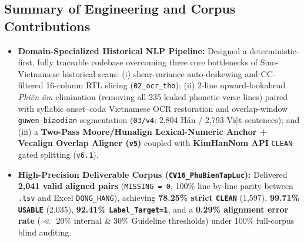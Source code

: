 \documentclass[a4paper]{article}
\begin{document}
\subsection{Summary of Engineering and Corpus Contributions}
\begin{itemize}
  \item \textbf{Domain-Specialized Historical NLP Pipeline:} Designed a deterministic-first, fully traceable codebase overcoming three core bottlenecks of Sino-Vietnamese historical scans: (i) shear-variance auto-deskewing and CC-filtered 16-column RTL slicing (\texttt{02\_ocr\_tho}); (ii) 2-line upward-lookahead \textit{Phiên âm} elimination (removing all 235 leaked phonetic verse lines) paired with syllabic onset--coda Vietnamese OCR restoration and overlap-window \texttt{guwen-biaodian} segmentation (\texttt{03/v4}: 2,804 Hán / 2,793 Việt sentences); and (iii) a \textbf{Two-Pass Moore/Hunalign Lexical-Numeric Anchor + Vecalign Overlap Aligner (\texttt{v5})} coupled with \textbf{KimHanNom API} \texttt{CLEAN}-gated splitting (\texttt{v6.1}).
  \item \textbf{High-Precision Deliverable Corpus (\texttt{CV16\_PhuBienTapLuc}):} Delivered \textbf{2,041 valid aligned pairs} (\texttt{MISSING = 0}, 100\% line-by-line parity between \texttt{.tsv} and Excel \texttt{DONG\_HANG}), achieving \textbf{78.25\% strict \texttt{CLEAN}} (1,597), \textbf{99.71\% \texttt{USABLE}} (2,035), \textbf{92.41\% \texttt{Label\_Target=1}}, and a \textbf{0.29\% alignment error rate} ($\ll$ 20\% internal \& 30\% Guideline thresholds) under 100\% full-corpus blind auditing.
\end{itemize}
\end{document}
